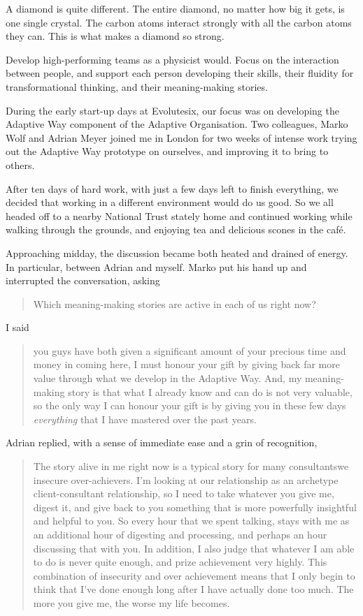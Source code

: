 A diamond is quite different. The entire diamond, no matter how big it gets, is one single crystal. The carbon atoms interact strongly with all the carbon atoms they can. This is what makes a diamond so strong.


Develop high-performing teams as a physicist would. Focus on the interaction between people, and support each person developing their skills, their fluidity for transformational thinking, and their meaning\hyp{}making stories.


\begin{longstoryblock}
During the early start-up days at Evolutesix, our focus was on developing the Adaptive Way component of the Adaptive Organisation.  Two colleagues, Marko Wolf and Adrian Meyer joined me in London for two weeks of intense work trying out the Adaptive Way prototype on ourselves, and improving it to bring to others.


After ten days of hard work, with just a few days left to finish everything, we decided that working in a different environment would do us good. So we all headed off to a nearby National Trust stately home and continued working while walking through the grounds, and enjoying tea and delicious scones in the café.


Approaching midday, the discussion became both heated and drained of energy. In particular, between Adrian and myself. Marko put his hand up and interrupted the conversation, asking \begin{quote} Which meaning\hyp{}making stories are active in each of us right now? \end{quote}


I said \begin{quote}you guys have both given a significant amount of your precious time and money in coming here, I must honour your gift by giving back far more value through what we develop in the Adaptive Way.  And, my meaning\hyp{}making story is that what I already know and can do is not very valuable, so the only way I can honour your gift is by giving you in these few days \emph{everything} that I have mastered over the past years.\end{quote}


Adrian replied, with a sense of immediate ease and a grin of recognition, \begin{quote}The story alive in me right now is a typical story for many consultants\textemdash we insecure over\hyp{}achievers. I'm looking at our relationship as an archetype client-consultant relationship, so I need to take whatever you give me, digest it, and give back to you something that is more powerfully insightful and helpful to you. So every hour that we spent talking, stays with me as an additional hour of digesting and processing, and perhaps an hour discussing that with you. In addition, I also judge that whatever I am able to do is never quite enough, and prize achievement very highly. This combination of insecurity and over achievement means that I only begin to think that I've done enough long after I have actually done too much. The more you give me, the worse my life becomes.\end{quote}



\end{longstoryblock}

